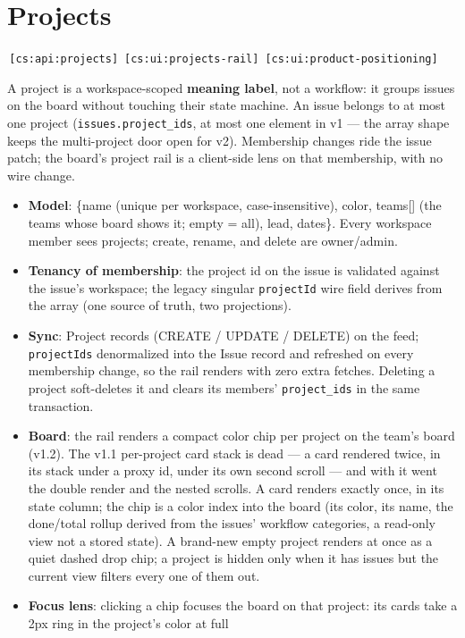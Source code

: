 \documentclass[11pt,a4paper]{report}
\newcommand{\cs}[1]{\,\texttt{\scriptsize[cs:#1]}\label{cs:#1}}
\begin{document}
\section{Projects}
\label{sec:projects}
\cs{api:projects}
\cs{ui:projects-rail}
\cs{ui:product-positioning}

A project is a workspace-scoped \textbf{meaning label}, not a workflow:
it groups issues on the board without touching their state machine. An
issue belongs to at most one project (\texttt{issues.project\_ids}, at
most one element in v1 --- the array shape keeps the multi-project door
open for v2). Membership changes ride the issue patch; the board's
project rail is a client-side lens on that membership, with no wire
change.

\begin{itemize}
\item \textbf{Model}: \{name (unique per workspace, case-insensitive),
  color, teams[] (the teams whose board shows it; empty = all), lead,
  dates\}. Every workspace member sees projects; create, rename, and
  delete are owner/admin.
\item \textbf{Tenancy of membership}: the project id on the issue is
  validated against the issue's workspace; the legacy singular
  \texttt{projectId} wire field derives from the array (one source of
  truth, two projections).
\item \textbf{Sync}: Project records (CREATE / UPDATE / DELETE) on the
  feed; \texttt{projectIds} denormalized into the Issue record and
  refreshed on every membership change, so the rail renders with zero
  extra fetches. Deleting a project soft-deletes it and clears its
  members' \texttt{project\_ids} in the same transaction.
\item \textbf{Board}: the rail renders a compact color chip per project
  on the team's board (v1.2). The v1.1 per-project card stack is
  dead --- a card rendered twice, in its stack under a proxy id, under
  its own second scroll --- and with it went the double render and the
  nested scrolls. A card renders exactly once, in its state column;
  the chip is a color index into the board (its color, its name, the
  done/total rollup derived from the issues' workflow categories, a
  read-only view not a stored state). A brand-new empty project renders
  at once as a quiet dashed drop chip; a project is hidden only when it
  has issues but the current view filters every one of them out.
\item \textbf{Focus lens}: clicking a chip focuses the board on that
  project: its cards take a 2px ring in the project's color at full

\end{itemize}
\end{document}
